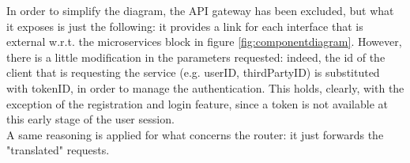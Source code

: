 In order to simplify the diagram, the API gateway has been excluded, but what it exposes is just the following: it provides a link for each
interface that is external w.r.t. the microservices block in figure \ref{fig:componentdiagram}. However, there is a little modification in the
parameters requested: indeed, the id of the client that is requesting the service (e.g. userID, thirdPartyID) is substituted with
tokenID, in order to manage the authentication. This holds, clearly, with the exception of the registration and login feature, since a token 
is not available at this early stage of the user session. \\ 
A same reasoning is applied for what concerns the router: it just forwards the "translated" requests.